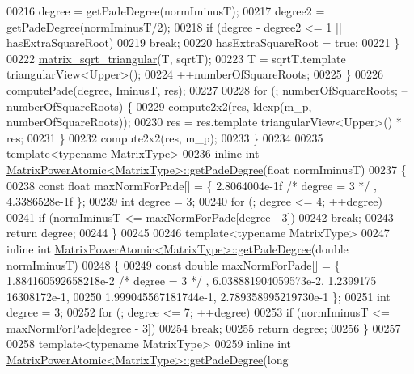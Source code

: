 \begin{DoxyCode}
00216       degree = getPadeDegree(normIminusT);
00217       degree2 = getPadeDegree(normIminusT/2);
00218       \textcolor{keywordflow}{if} (degree - degree2 <= 1 || hasExtraSquareRoot)
00219     \textcolor{keywordflow}{break};
00220       hasExtraSquareRoot = \textcolor{keyword}{true};
00221     \}
00222     \hyperlink{namespace_eigen_ae51c91f920f6ea4a7f6f72caa1e8249f}{matrix\_sqrt\_triangular}(T, sqrtT);
00223     T = sqrtT.template triangularView<Upper>();
00224     ++numberOfSquareRoots;
00225   \}
00226   computePade(degree, IminusT, res);
00227 
00228   \textcolor{keywordflow}{for} (; numberOfSquareRoots; --numberOfSquareRoots) \{
00229     compute2x2(res, ldexp(m\_p, -numberOfSquareRoots));
00230     res = res.template triangularView<Upper>() * res;
00231   \}
00232   compute2x2(res, m\_p);
00233 \}
00234   
00235 \textcolor{keyword}{template}<\textcolor{keyword}{typename} MatrixType>
00236 \textcolor{keyword}{inline} \textcolor{keywordtype}{int} \hyperlink{class_eigen_1_1_matrix_power_atomic}{MatrixPowerAtomic<MatrixType>::getPadeDegree}(\textcolor{keywordtype}{float} 
      normIminusT)
00237 \{
00238   \textcolor{keyword}{const} \textcolor{keywordtype}{float} maxNormForPade[] = \{ 2.8064004e-1f \textcolor{comment}{/* degree = 3 */} , 4.3386528e-1f \};
00239   \textcolor{keywordtype}{int} degree = 3;
00240   \textcolor{keywordflow}{for} (; degree <= 4; ++degree)
00241     \textcolor{keywordflow}{if} (normIminusT <= maxNormForPade[degree - 3])
00242       \textcolor{keywordflow}{break};
00243   \textcolor{keywordflow}{return} degree;
00244 \}
00245 
00246 \textcolor{keyword}{template}<\textcolor{keyword}{typename} MatrixType>
00247 \textcolor{keyword}{inline} \textcolor{keywordtype}{int} \hyperlink{class_eigen_1_1_matrix_power_atomic}{MatrixPowerAtomic<MatrixType>::getPadeDegree}(\textcolor{keywordtype}{double} 
      normIminusT)
00248 \{
00249   \textcolor{keyword}{const} \textcolor{keywordtype}{double} maxNormForPade[] = \{ 1.884160592658218e-2 \textcolor{comment}{/* degree = 3 */} , 6.038881904059573e-2, 1.2399175
      16308172e-1,
00250       1.999045567181744e-1, 2.789358995219730e-1 \};
00251   \textcolor{keywordtype}{int} degree = 3;
00252   \textcolor{keywordflow}{for} (; degree <= 7; ++degree)
00253     \textcolor{keywordflow}{if} (normIminusT <= maxNormForPade[degree - 3])
00254       \textcolor{keywordflow}{break};
00255   \textcolor{keywordflow}{return} degree;
00256 \}
00257 
00258 \textcolor{keyword}{template}<\textcolor{keyword}{typename} MatrixType>
00259 \textcolor{keyword}{inline} \textcolor{keywordtype}{int} \hyperlink{class_eigen_1_1_matrix_power_atomic}{MatrixPowerAtomic<MatrixType>::getPadeDegree}(\textcolor{keywordtype}{long} \textcolor{keywordtype}{
}
\end{DoxyCode}
